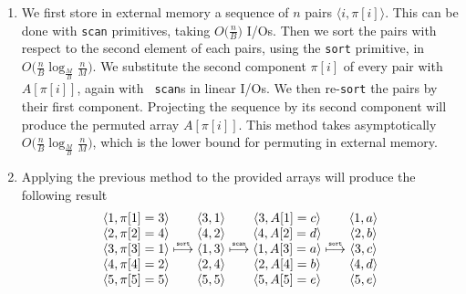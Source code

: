\begin{enumerate}

  \item We first store in external memory a sequence of $n$ pairs $\langle i,
  \pi[i] \rangle$. This can be done with {\tt scan} primitives, taking
  $O\big(\frac{n}{B}\big)$ I/Os. Then we sort the pairs with respect to the
  second element of each pairs, using the {\tt sort} primitive, in
  $O\big(\frac{n}{B}\log_{\frac{M}{B}}\frac{n}{M}\big)$. We substitute the
  second component $\pi[i]$ of every pair with $A[\pi[i]]$, again with {\tt
  scan}s in linear I/Os. We then re-{\tt sort} the pairs by their first
  component. Projecting the sequence by its second component will produce the
  permuted array $A[\pi[i]]$. This method takes asymptotically
  $O\big(\frac{n}{B}\log_{\frac{M}{B}}\frac{n}{M}\big)$, which is the lower
  bound for permuting in external memory.

  \item Applying the previous method to the provided arrays will produce the
  following result
  \begin{align*}
    \begin{matrix}
      \langle 1, \pi[1] = 3 \rangle \\
      \langle 2, \pi[2] = 4 \rangle \\
      \langle 3, \pi[3] = 1 \rangle \\
      \langle 4, \pi[4] = 2 \rangle \\
      \langle 5, \pi[5] = 5 \rangle \\
    \end{matrix}
    \stackrel{\text{\tiny \tt sort}}{\longmapsto}
    \begin{matrix}
      \langle 3, 1 \rangle \\
      \langle 4, 2 \rangle \\
      \langle 1, 3 \rangle \\
      \langle 2, 4 \rangle \\
      \langle 5, 5 \rangle \\
    \end{matrix}
    \stackrel{\text{\tiny \tt scan}}{\longmapsto}
    \begin{matrix}
      \langle 3, A[1] = c \rangle \\
      \langle 4, A[2] = d \rangle \\
      \langle 1, A[3] = a \rangle \\
      \langle 2, A[4] = b \rangle \\
      \langle 5, A[5] = e \rangle \\
    \end{matrix}
    \stackrel{\text{\tiny \tt sort}}{\longmapsto}
    \begin{matrix}
      \langle 1, a \rangle \\
      \langle 2, b \rangle \\
      \langle 3, c \rangle \\
      \langle 4, d \rangle \\
      \langle 5, e \rangle \\
    \end{matrix}
  \end{align*}

\end{enumerate}
